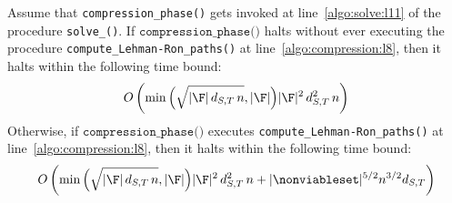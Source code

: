 \begin{lemma}\label{lemma:complexity_compression_phase}
Assume that \texttt{compression\_phase()} gets invoked at line~\ref{algo:solve:l11} of
the procedure \texttt{solve\_\mainproblem()}. If $\texttt{compression\_phase()}$ halts without ever executing
the procedure \texttt{compute\_Lehman-Ron\_paths()} at line~\ref{algo:compression:l8},
then it halts within the following time bound:
\begin{equation}\label{eqn:compression-phase-first-time-bound}
O\left(\min\Big(\sqrt{|\F|\, d_{S,T}\, n}, |\F|\Big) |\F|^2\, d^2_{S,T}\, n \right)
\end{equation}
Otherwise, if $\texttt{compression\_phase()}$ executes
\texttt{compute\_Lehman-Ron\_paths()} at line~\ref{algo:compression:l8},
then it halts within the following time bound:
\begin{equation}\label{eqn:compression-phase-second-time-bound}
O\left(\min\Big(\sqrt{|\F|\, d_{S,T}\, n}, |\F|\Big) |\F|^2\, d^2_{S,T}\, n +
 |\nonviableset|^{5/2} n^{3/2} d_{S,T} \right)
\end{equation}
\end{lemma}

